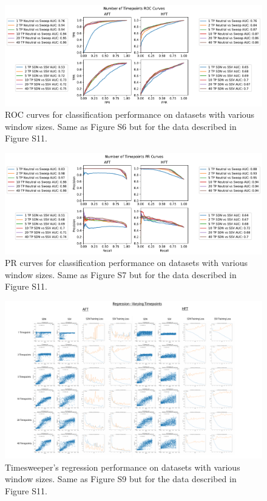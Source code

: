 \begin{figure}
    \centering
    \includegraphics[width=\textwidth]{figures/ap1/S20_TPs_Vary_ROC.pdf}
    \caption[ROC curves for classification performance on datasets with various window sizes.]{ROC curves for classification performance on datasets with various window sizes. Same as Figure S6 but for the data described in Figure S11.}
    \label{fig:S20_TPs_Vary_ROC}
\end{figure}

\begin{figure}
    \centering
    \includegraphics[width=\textwidth]{figures/ap1/S21_TPs_Vary_PR.pdf}
    \caption[PR curves for classification performance on datasets with various window sizes.]{PR curves for classification performance on datasets with various window sizes. Same as Figure S7 but for the data described in Figure S11.}
    \label{fig:S21_TPs_Vary_PR}
\end{figure}

\begin{figure}
    \centering
    \includegraphics[width=\textwidth]{figures/ap1/S22_TPs_Vary_Reg.pdf}
    \caption[Timesweeper’s regression performance on datasets with various window sizes.]{Timesweeper’s regression performance on datasets with various window sizes. Same as  Figure S9 but for the data described in Figure S11.}
    \label{fig:S22_TPs_Vary_Reg}
\end{figure}

